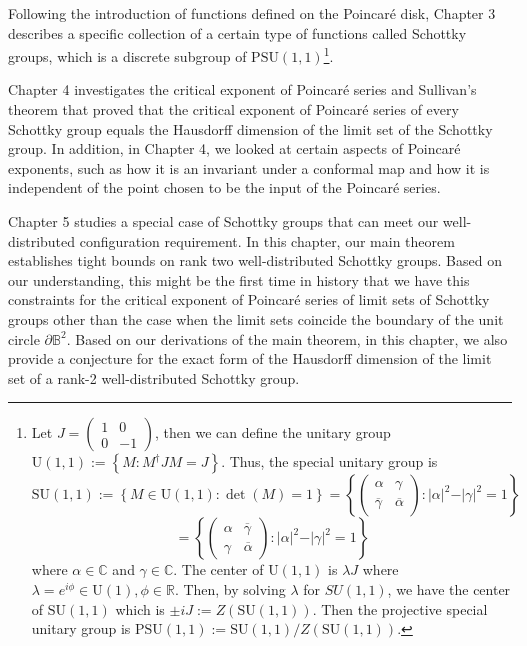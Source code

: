 \documentclass[12pt,oneside]{sfsuthesis}
\theoremstyle{plain} %
\theoremstyle{definition}  %
\theoremstyle{remark}  %
\theoremstyle{plain}
\begin{document}
{Following the introduction of functions defined on the Poincar\'{e} disk, Chapter 3 describes a specific collection of a certain type of functions called Schottky groups, which is a discrete subgroup of $\text{PSU}(1,1)$\footnote{Let $J=\begin{pmatrix}
1 &  0\\
0 &  -1
\end{pmatrix}$, then we can define the unitary group $\text{U}(1,1):=\left\lbrace M: M^{\dagger}JM=J\right\rbrace$. Thus, the special unitary group is $$\text{SU}(1,1):=\left\lbrace M\in \text{U}(1,1): \det(M)
=1\right\rbrace
=\left\lbrace \begin{pmatrix}
\alpha &  \gamma\\
\overline{\gamma} &  \overline{\alpha}
\end{pmatrix}: \vert \alpha \vert^2-\vert \gamma\vert^2=1\right\rbrace
$$
$$
=\left\lbrace \begin{pmatrix}
\alpha &  \overline{\gamma}\\
\gamma &  \overline{\alpha}
\end{pmatrix}: \vert \alpha \vert^2-\vert \gamma\vert^2=1\right\rbrace$$ where $\alpha\in\mathbb{C}$ and $\gamma\in\mathbb{C}$. The center of $\text{U}(1,1)$ is $\lambda J$ where $\lambda = e^{i\phi}\in \text{U}(1), \phi\in\mathbb{R}$. Then, by solving $\lambda$ for $SU(1,1)$, we have the center of $\text{SU}(1,1)$ which is $\pm i J:=Z(\text{SU}(1,1))$. Then the projective special unitary group is $\text{PSU}(1,1):=\text{SU}(1,1)/Z(\text{SU}(1,1))$.}.


Chapter 4 investigates the critical exponent of Poincar\'{e} series and Sullivan's theorem that proved that the critical exponent of Poincar\'{e} series of every Schottky group equals the Hausdorff dimension of the limit set of the Schottky group. In addition, in Chapter 4, we looked at certain aspects of Poincar\'{e} exponents, such as how it is an invariant under a conformal map and how it is independent of the point chosen to be the input of the Poincar\'{e} series. 


Chapter 5 studies a special case of Schottky groups that can meet our well-distributed configuration requirement. In this chapter, our main theorem establishes tight bounds on rank two well-distributed Schottky groups. Based on our understanding, this might be the first time in history that we have this constraints for the critical exponent of Poincar\'{e} series of limit sets of Schottky groups other than the case when the limit sets coincide the boundary of the unit circle $\partial \mathbb{B}^2$. Based on our derivations of the main theorem, in this chapter, we also provide a conjecture for the exact form of the Hausdorff dimension of the limit set of a rank-2 well-distributed Schottky group.


}
\end{document}
